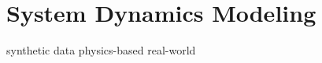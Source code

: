 \section{System Dynamics Modeling} 
\label{sec:experiments:dynamics_modeling}

synthetic data
physics-based
real-world


